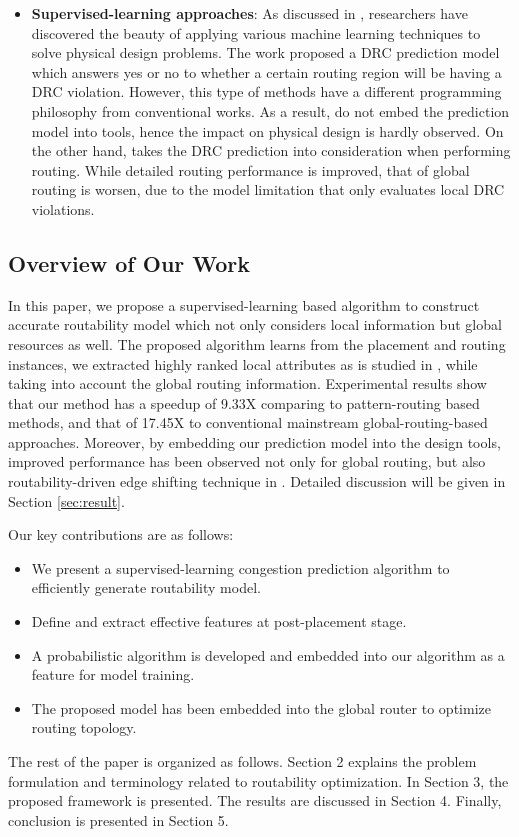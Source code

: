 \begin{itemize}
\item \textbf{Supervised-learning approaches}: As discussed in \cite{mlinphysicaldesign}, researchers have discovered the beauty of applying various machine learning techniques to solve physical design problems. The work \cite{drcpredict18} proposed a DRC prediction model which answers yes or no to whether a certain routing region will be having a DRC violation. However, this type of methods have a different programming philosophy from conventional works. As a result, \cite{drcpredict18,drcDAT18} do not embed the prediction model into tools, hence the impact on physical design is hardly observed. On the other hand, \cite{drcingr} takes the DRC prediction into consideration when performing routing. While detailed routing performance is improved, that of global routing is worsen, due to the model limitation that only evaluates local DRC violations.
\end{itemize}


\subsection{Overview of Our Work}
In this paper, we propose a supervised-learning based algorithm to construct accurate routability model which not only considers local information but global resources as well. The proposed algorithm learns from the placement and routing instances, we extracted highly ranked local attributes as is studied in \cite{parameterstudy}, while taking into account the global routing information. Experimental results show that our method has a speedup of 9.33X comparing to pattern-routing based methods, and that of 17.45X to conventional mainstream global-routing-based approaches. Moreover, by embedding our prediction model into the design tools, improved performance has been observed not only for global routing, but also routability-driven edge shifting technique in \cite{fastroute}. Detailed discussion will be given in Section \ref{sec:result}. 

Our key contributions are as follows:
\begin{itemize}
\item We present a supervised-learning congestion prediction algorithm to efficiently generate routability model.
\item Define and extract effective features at post-placement stage.
\item A probabilistic algorithm is developed and embedded into our algorithm as a feature for model training.
\item The proposed model has been embedded into the global router to optimize routing topology.
\end{itemize}

The rest of the paper is organized as follows. Section 2 explains the problem formulation and terminology related to routability optimization. In Section 3, the proposed framework is presented. The results are discussed in Section 4. Finally, conclusion is presented in Section 5.
